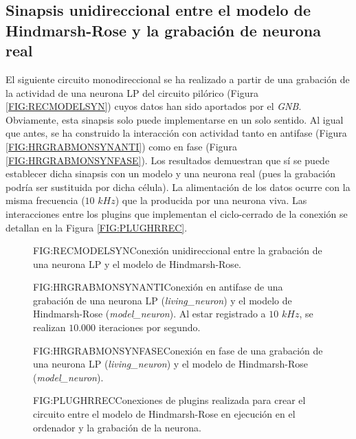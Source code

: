 \subsection{Sinapsis unidireccional entre el modelo de Hindmarsh-Rose y la grabación de neurona real\label{SS:HRREC}}


El siguiente circuito monodireccional se ha realizado a partir de una grabación de la actividad de una neurona LP del circuito pilórico (Figura \ref{FIG:RECMODELSYN}) cuyos datos han sido aportados por el \textit{GNB}. Obviamente, esta sinapsis solo puede implementarse en un solo sentido. Al igual que antes, se ha construido la interacción con actividad tanto en antifase (Figura \ref{FIG:HRGRABMONSYNANTI}) como en fase (Figura \ref{FIG:HRGRABMONSYNFASE}). Los resultados demuestran que sí se puede establecer dicha sinapsis con un modelo y una neurona real (pues la grabación podría ser sustituida por dicha célula). La alimentación de los datos ocurre con la misma frecuencia ($10$ $kHz$) que la producida por una neurona viva. Las interacciones entre los plugins que implementan el ciclo-cerrado de la conexión se detallan en la Figura \ref{FIG:PLUGHRREC}.

\begin{figure}[Esquema de conexión entre el la grabación LP y el model]{FIG:RECMODELSYN}{Conexión unidireccional entre la grabación de una neurona LP y el modelo de Hindmarsh-Rose.}
\end{figure}\textbf{}

\begin{figure}[Conexión monodirecional grabación-modelo en antifase]{FIG:HRGRABMONSYNANTI}{Conexión en antifase de una grabación de una neurona LP (\textit{living\_neuron}) y el modelo de Hindmarsh-Rose (\textit{model\_neuron}). Al estar registrado a $10$ $kHz$, se realizan $10.000$ iteraciones por segundo.}
\end{figure}


\begin{figure}[Conexión monodireccional grabación-modelo en fase]{FIG:HRGRABMONSYNFASE}{Conexión en fase de una grabación de una neurona LP (\textit{living\_neuron}) y el modelo de Hindmarsh-Rose (\textit{model\_neuron}).}
\end{figure}

\begin{figure}[Esquema de conexión de plugins para la sinapsis entre el modelo y la grabación de la neurona]{FIG:PLUGHRREC}{Conexiones de plugins realizada para crear el circuito entre el modelo de Hindmarsh-Rose en ejecución en el ordenador y la grabación de la neurona.}
\end{figure}\textbf{}
